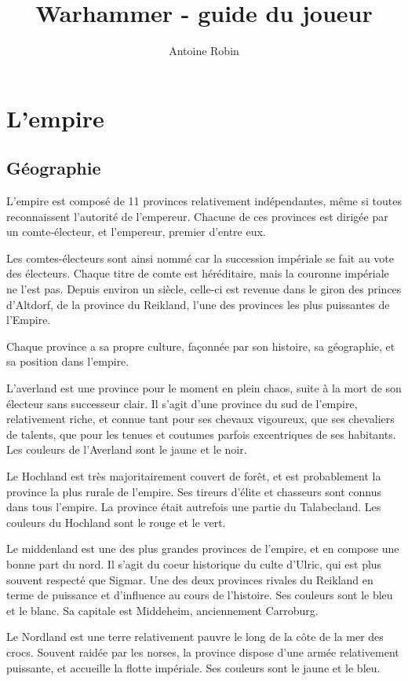 \documentclass[10pt,a4paper]{book}
\author{ Antoine Robin}
\title{Warhammer - guide du joueur}
\begin{document}
\chapter{L'empire}
\section{Géographie}
L'empire est composé de 11 provinces relativement indépendantes, même si toutes reconnaissent l'autorité de l'empereur. Chacune de ces provinces est dirigée par un comte-électeur, et l'empereur, premier d'entre eux.

Les comtes-électeurs sont ainsi nommé car la succession impériale se fait au vote des électeurs. Chaque titre de comte est héréditaire, mais la couronne impériale ne l'est pas. Depuis environ un siècle, celle-ci est revenue dans le giron des princes d'Altdorf, de la province du Reikland, l'une des provinces les plus puissantes de l'Empire.

Chaque province a sa propre culture, façonnée par son histoire, sa géographie, et sa position dans l'empire.

L'averland est une province pour le moment en plein chaos, suite à la mort de son électeur sans successeur clair. Il s'agit d'une province du sud de l'empire, relativement riche, et connue tant pour ses chevaux vigoureux, que ses chevaliers de talents, que pour les tenues et coutumes parfois excentriques de ses habitants. Les couleurs de l'Averland sont le jaune et le noir.

Le Hochland est très majoritairement couvert de forêt, et est probablement la province la plus rurale de l'empire. Ses tireurs d'élite et chasseurs sont connus dans tous l'empire. La province était autrefois une partie du Talabecland. Les couleurs du Hochland sont le rouge et le vert.

Le middenland est une des plus grandes provinces de l'empire, et en compose une bonne part du nord. Il s'agit du coeur historique du culte d'Ulric, qui est plus souvent respecté que Sigmar. Une des deux provinces rivales du Reikland en terme de puissance et d'influence au cours de l'histoire. Ses couleurs sont le bleu et le blanc. Sa capitale est Middeheim, anciennement Carroburg.

Le Nordland est une terre relativement pauvre le long de la côte de la mer des crocs. Souvent raidée par les norses, la province dispose d'une armée relativement puissante, et accueille la flotte impériale. Ses couleurs sont le jaune et le bleu.
\end{document}
